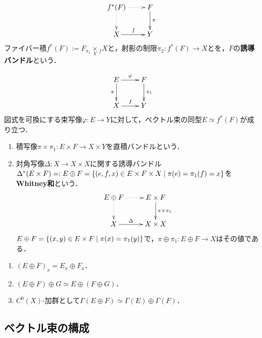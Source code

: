 \documentclass[uplatex,dvipdfmx]{jsreport}
\begin{document}
\begin{definition}
    \[\xymatrix{
        f^*(F)\ar@{.>}[r]\ar@{.>}[d]&F\ar[d]^-{\pi}\\
        X\ar[r]^-f&Y
    }\]
    ファイバー積$f^*(F):=F_{\pi_1}\underset{Y}{\times}{}_fX$と，射影の制限$\pi_2:f^*(F)\to X$とを，$F$の\textbf{誘導バンドル}という．
\end{definition}

\begin{theorem}
    \[\xymatrix{
        E\ar[r]^-\varphi\ar[d]_-\pi&F\ar[d]^-{\pi_1}\\
        X\ar[r]^-f&Y
    }\]
    図式を可換にする束写像$\varphi:E\to Y$に対して，ベクトル束の同型$E\simeq f^*(F)$が成り立つ．
\end{theorem}

\begin{example}[Whitney和]\mbox{}
    \begin{enumerate}
        \item 積写像$\pi\times\pi_1:E\times F\to X\times Y$を直積バンドルという．
        \item 対角写像$\Delta:X\to X\times X$に関する誘導バンドル$\Delta^*(E\times F)=:E\oplus F=\left\{(e,f,x)\in E\times F\times X\mid \pi(e)=\pi_1(f)=x\right\}$を\textbf{Whitney和}という．
        \[\xymatrix{
            E\oplus F\ar@{.>}[r]\ar@{.>}[d]&E\times F\ar[d]^-{\pi\times\pi_1}\\
            X\ar[r]^-\Delta&X\times X
        }\]
        $E\oplus F=\left\{(x,y)\in E\times F\mid \pi(x)=\pi_1(y)\right\}$で，$\pi\oplus\pi_1:E\oplus F\to X$はその値である．
    \end{enumerate}
\end{example}

\begin{lemma}[Whitney和の性質]\mbox{}
    \begin{enumerate}
        \item $(E\oplus F)_x=E_x\oplus F_x$．
        \item $(E\oplus F)\oplus G\simeq E\oplus(F\oplus G)$．
        \item $C^0(X)$-加群として$\Gamma(E\oplus F)\simeq\Gamma(E)\oplus\Gamma(F)$．
    \end{enumerate}
\end{lemma}

\subsection{ベクトル束の構成}
\end{document}

